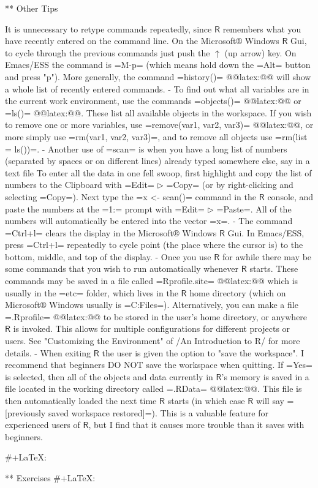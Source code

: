** Other Tips

It is unnecessary to retype commands repeatedly, since \(\mathsf{R}\)
remembers what you have recently entered on the command line. On the
Microsoft\(\circledR\) Windows \(\mathsf{R}\) Gui, to cycle through
the previous commands just push the \(\uparrow\) (up arrow) key. On
Emacs/ESS the command is =M-p= (which means hold down the =Alt= button
and press "p"). More generally, the command =history()=
@@latex:@@ will show a whole list of recently
entered commands.
- To find out what all variables are in the current work environment,
  use the commands =objects()= @@latex:@@ or
  =ls()= @@latex:@@. These list all available objects in
  the workspace. If you wish to remove one or more variables, use
  =remove(var1, var2, var3)= @@latex:@@, or more
  simply use =rm(var1, var2, var3)=, and to remove all objects use
  =rm(list = ls())=.
- Another use of =scan= is when you have a long list of numbers
  (separated by spaces or on different lines) already typed somewhere
  else, say in a text file To enter all the data in one fell swoop,
  first highlight and copy the list of numbers to the Clipboard with
  =Edit= \(\triangleright\) =Copy= (or by right-clicking and selecting
  =Copy=). Next type the =x <- scan()= command in the \(\mathsf{R}\)
  console, and paste the numbers at the =1:= prompt with =Edit=
  \(\triangleright\) =Paste=. All of the numbers will automatically be
  entered into the vector =x=.
- The command =Ctrl+l= clears the display in the
  Microsoft\(\circledR\) Windows \(\mathsf{R}\) Gui. In Emacs/ESS,
  press =Ctrl+l= repeatedly to cycle point (the place where the cursor
  is) to the bottom, middle, and top of the display.
- Once you use \(\mathsf{R}\) for awhile there may be some commands
  that you wish to run automatically whenever \(\mathsf{R}\)
  starts. These commands may be saved in a file called =Rprofile.site=
  @@latex:@@ which is
  usually in the =etc= folder, which lives in the \(\mathsf{R}\) home
  directory (which on Microsoft\(\circledR\) Windows usually is
  =C:\Program Files\R=). Alternatively, you can make a file
  =.Rprofile= @@latex:@@ to be
  stored in the user's home directory, or anywhere \(\mathsf{R}\) is
  invoked. This allows for multiple configurations for different
  projects or users. See "Customizing the Environment" of /An
  Introduction to R/ for more details.
- When exiting \(\mathsf{R}\) the user is given the option to "save
  the workspace". I recommend that beginners DO NOT save the
  workspace when quitting. If =Yes= is selected, then all of the
  objects and data currently in \(\mathsf{R}\)'s memory is saved in a
  file located in the working directory called
  =.RData= @@latex:@@. This file is then
  automatically loaded the next time \(\mathsf{R}\) starts (in which
  case \(\mathsf{R}\) will say =[previously saved workspace
  restored]=). This is a valuable feature for experienced users of
  \(\mathsf{R}\), but I find that it causes more trouble than it saves
  with beginners.

#+LaTeX: \newpage{}

** Exercises
#+LaTeX: \setcounter{thm}{0}
